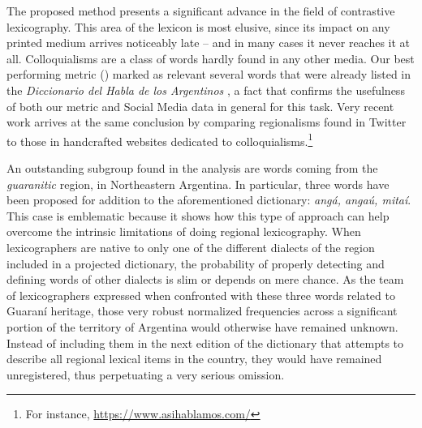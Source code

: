 

The proposed method presents a significant advance in the field of contrastive lexicography. This area of the lexicon is most elusive, since its impact on any printed medium arrives noticeably late -- and in many cases it never reaches it at all. Colloquialisms are a class of words hardly found in any other media. Our best performing metric (\usermetric{}) marked as relevant several words that were already listed in the \emph{Diccionario del Habla de los Argentinos} \cite {academia2008diccionario}, a fact that  confirms the usefulness of both our metric and Social Media data in general for this task. Very recent work \cite{jimenez2018automatic} arrives at the same conclusion by comparing regionalisms found in Twitter to those in handcrafted websites dedicated to colloquialisms.\footnote{For instance, \url{https://www.asihablamos.com/}}

An outstanding subgroup found in the analysis are words coming from the \textit{guaranitic} region, in Northeastern Argentina. In particular, three words 
have been proposed for addition 
to the aforementioned dictionary: \emph{angá, angaú, mitaí}. This case is emblematic because it shows how this type of approach can help overcome the intrinsic limitations of doing regional lexicography. When lexicographers are native to only one of the different dialects of the region included in a projected dictionary, the probability of properly detecting and defining words of other dialects is slim or depends on mere chance. As the team of lexicographers expressed when confronted with these three words related to Guaraní heritage, those very robust normalized frequencies across a significant portion of the territory of Argentina would otherwise have remained unknown. Instead of including them in the next edition of the dictionary that attempts to describe all regional lexical items in the country, they would have remained unregistered, thus perpetuating a very serious omission.


